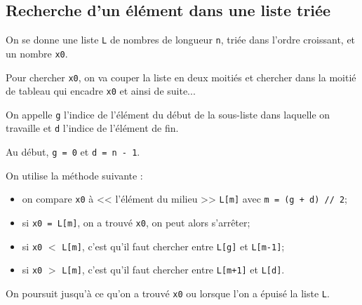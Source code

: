 %
%
%

\subsection*{Recherche d'un élément dans une liste triée}

On se donne une liste \texttt{L} de nombres de longueur \texttt{n}, {triée dans l'ordre croissant}, et un nombre \texttt{x0}. 

Pour chercher \texttt{x0}, on va couper la liste en deux moitiés et chercher dans la moitié de tableau qui encadre \texttt{x0} et ainsi de suite...

On appelle \texttt{g} l'indice de l'élément du début de la sous-liste dans laquelle on travaille et \texttt{d} l'indice de l'élément de fin.

Au début, \texttt{g = 0} et \texttt{d = n - 1}.

%

On utilise la méthode suivante :
\begin{itemize}
\item on compare \texttt{x0} à << l'élément du milieu >>  \texttt{L[m]} avec \texttt{m = (g + d) // 2};
\item si \texttt{x0 = L[m]}, on a trouvé \texttt{x0}, on peut alors s'arrêter;
\item si \texttt{x0} $<$ \texttt{L[m]}, c'est qu'il faut chercher entre \texttt{L[g]} et  \texttt{L[m-1]};%
\item si \texttt{x0} $>$ \texttt{L[m]}, c'est qu'il faut chercher  entre \texttt{L[m+1]} et \texttt{L[d]}.%
\end{itemize}

On poursuit jusqu'à ce qu'on a trouvé \texttt{x0} ou lorsque l'on a épuisé la liste \texttt{L}.


